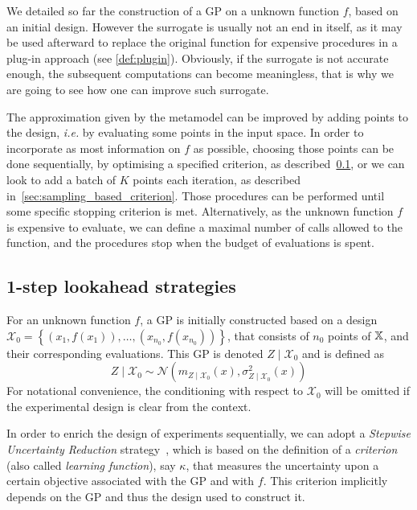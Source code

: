 \documentclass[../../Main_ManuscritThese.tex]{subfiles}
\begin{document}
We detailed so far the construction of a GP on a unknown function $f$,
based on an initial design. However the surrogate is usually not an
end in itself, as it may be used afterward to replace the original
function for expensive procedures in a plug-in approach (see
\cref{def:plugin}). Obviously, if the surrogate is not accurate
enough, the subsequent computations can become meaningless, that is
why we are going to see how one can improve such surrogate.

The approximation given by the metamodel can be improved by adding
points to the design, \emph{i.e.} by evaluating some points in the
input space. In order to incorporate as most information on $f$ as
possible, choosing those points can be done sequentially, by
optimising a specified criterion, as described~\cref{ssec:1stepSUR},
or we can look to add a batch of $K$ points each iteration, as
described in~\cref{sec:sampling_based_criterion}.  Those procedures
can be performed until some specific stopping criterion is
met. Alternatively, as the unknown function $f$ is expensive to
evaluate, we can define a maximal number of calls allowed to the
function, and the procedures stop when the budget of evaluations is
spent.



\subsection{1-step lookahead strategies}
\label{ssec:1stepSUR}
For an unknown function $f$, a GP is initially constructed based on a
design
$\mathcal{X}_0 = \left\{\left(x_1,f(x_1)\right), \dots, \left(x_{n_0},
    f(x_{n_0})\right)\right\}$, that consists of $n_0$ points of
$\mathbb{X}$, and their corresponding evaluations. This GP is denoted
$Z \mid \mathcal{X}_0$ and is defined as
\begin{equation}
  \label{eq:ZgivenXGP}
  Z\mid \mathcal{X}_0 \sim \mathcal{N}(m_{Z\mid\mathcal{X}_0}(x),\sigma^2_{Z\mid\mathcal{X}_0}(x))
\end{equation}
For notational convenience, the conditioning with respect to
$\mathcal{X}_0$ will be omitted if the experimental design is clear
from the context.

In order to enrich the design of experiments sequentially, we can
adopt a \emph{Stepwise Uncertainty Reduction}
strategy~\citep{villemonteix_informational_2006}, which is based on
the definition of a \emph{criterion} (also called \emph{learning
  function}), say $\kappa$, that measures the uncertainty upon a
certain objective associated with the GP and with $f$. This criterion
implicitly depends on the GP and thus the design used to construct it.
\end{document}
